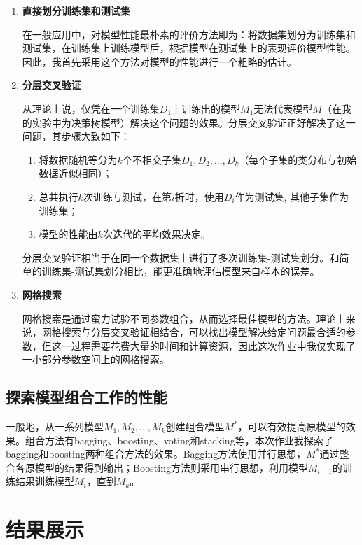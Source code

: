 \documentclass[12pt,a4paper]{article}
\theoremstyle{definition}
\begin{document}
\begin{enumerate}
\item \textbf{直接划分训练集和测试集}

在一般应用中，对模型性能最朴素的评价方法即为：将数据集划分为训练集和测试集，在训练集上训练模型后，根据模型在测试集上的表现评价模型性能。因此，我首先采用这个方法对模型的性能进行一个粗略的估计。

\item \textbf{分层交叉验证}

从理论上说，仅凭在一个训练集$D_1$上训练出的模型$M_1$无法代表模型$M$（在我的实验中为决策树模型）解决这个问题的效果。分层交叉验证正好解决了这一问题，其步骤大致如下：

\begin{enumerate}
	\item 将数据随机等分为$k$个不相交子集$D_1, D_2, ... ,D_k$（每个子集的类分布与初始数据近似相同）；
	
	\item 总共执行$k$次训练与测试，在第$i$折时，使用$D_i$作为测试集, 其他子集作为训练集；
	
	\item 模型的性能由$k$次迭代的平均效果决定。
\end{enumerate}

分层交叉验证相当于在同一个数据集上进行了多次训练集-测试集划分。和简单的训练集-测试集划分相比，能更准确地评估模型来自样本的误差。

\item \textbf{网格搜索}

网格搜索是通过蛮力试验不同参数组合，从而选择最佳模型的方法。理论上来说，网格搜索与分层交叉验证相结合，可以找出模型解决给定问题最合适的参数，但这一过程需要花费大量的时间和计算资源，因此这次作业中我仅实现了一小部分参数空间上的网格搜索。

\end{enumerate}

\subsection{探索模型组合工作的性能}

一般地，从一系列模型$M_1, M_2, ... , M_k$创建组合模型$M^*$，可以有效提高原模型的效果。组合方法有bagging、boosting、voting和stacking等，本次作业我探索了bagging和boosting两种组合方法的效果。Bagging方法使用并行思想，$M^*$通过整合各原模型的结果得到输出；Boosting方法则采用串行思想，利用模型$M_{i-1}$的训练结果训练模型$M_{i}$，直到$M_k$。

\section{结果展示}
\end{document}
